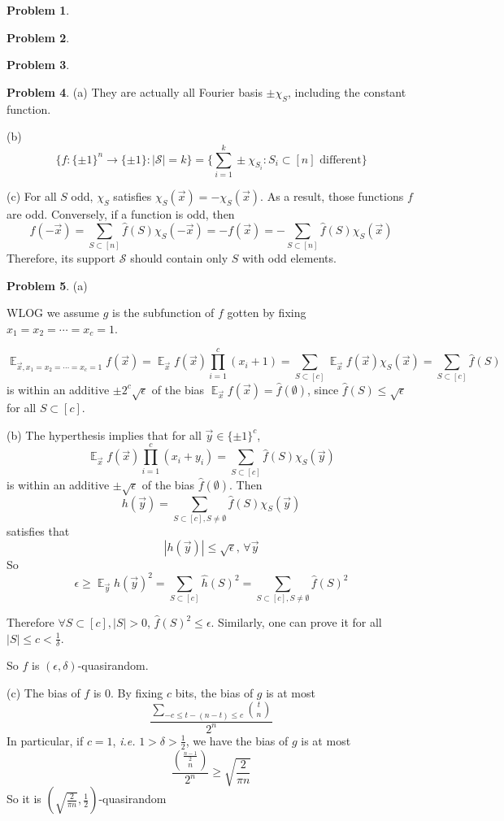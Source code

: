 \documentclass[a4paper]{article}
\theoremstyle{definition}
\newtheorem{problem}{Problem}
\theoremstyle{plain}
\newcommand{\Ebb}{\mathop\mathbb E}
\newcommand{\dps}{\displaystyle}
\newcommand{\<}{\left<}
\renewcommand{\>}{\right>}
\renewcommand{\Ebb}{\mathop\mathbb{E}}
\numberwithin{equation}{problem}
\newcommand{\ie}{ \textit{ i.e. } }
\begin{document}
\begin{problem}
    
\end{problem}
\begin{problem}
    
\end{problem}
\begin{problem}
    
\end{problem}
\begin{problem}
    (a) They are actually all Fourier basis  $ \pm\chi_S $, including the constant function.

    (b) 
    \[\{f:\{\pm 1\}^n\rightarrow \{\pm 1\}:|\mathcal{S}|=k\}=\{\sum_{i=1}^k\pm \chi_{S_i}:S_i\subset [n] \text{ different}\}\] 

    (c) For all  $ S $ odd,  $ \chi_S $ satisfies  $ \chi_S(\vec{x})=-\chi_S(\vec{x}) $. As a result, those functions  $ f $ are odd. Conversely, if a function is odd, then 
    \[f(-\vec{x})=\sum_{S\subset [n]}\hat{f}(S)\chi_S(-\vec{x})=-f(\vec{x})=-\sum_{S\subset [n]}\hat{f}(S)\chi_S(\vec{x})\]
    Therefore,   its support $   \mathcal{S}   $ should contain only  $ S $ with odd elements.      
\end{problem}
\begin{problem}
    (a) 

    WLOG we assume  $ g $ is the subfunction of  $ f $ gotten by fixing  $ x_1=x_2=\cdots=x_c=1 $.    
    
    \[\Ebb_{\vec{x},x_1=x_2=\cdots=x_c=1}f(\vec{x})=\Ebb_{\vec{x}}f(\vec{x})\prod_{i=1}^c(x_i+1)=\sum_{S\subset [c]}\Ebb_{\vec{x}}f(\vec{x})\chi_S(\vec{x})=\sum_{S\subset [c]}\hat{f}(S)\]
    is within an additive  $ \pm2^c\sqrt{\epsilon} $   of the bias  $ \dps\Ebb_{\vec{x}}f(\vec{x})=\hat{f}(\emptyset) $, since  $ \hat{f}(S) \leq \sqrt{\epsilon} $ for all  $ S\subset [c] $.
    
    (b) The hyperthesis implies that for all  $ \vec{y}\in \{\pm 1\}^c $, 
    \[\Ebb_{\vec{x}}f(\vec{x})\prod_{i=1}^c(x_i+y_i)=\sum_{S\subset [c]}\hat{f}(S)\chi_S(\vec{y})\]
    is within an additive  $ \pm \sqrt{\epsilon} $ of the bias  $ \hat{f}(\emptyset) $.
    Then 
    \[h(\vec{y})=\sum_{S\subset [c],S\neq \emptyset}\hat{f}(S)\chi_S(\vec{y})\]
    satisfies that 
    \[|h(\vec{y})| \leq \sqrt{\epsilon},\,\forall \vec{y}\]
    So 
    \[\epsilon \geq \Ebb_{\vec{y}}h(\vec{y})^2=\sum_{S\subset [c]}\hat{h}(S)^2=\sum_{S\subset [c],S\neq \emptyset}\hat{f}(S)^2\] 
    
    Therefore  $ \forall S\subset [c],|S|>0 $,  $ \hat{f}(S)^2 \leq \epsilon $. Similarly, one can prove it for all  $ |S| \leq c<\frac{1}{\delta} $.
    
    So  $ f $ is  $ (\epsilon,\delta) $-quasirandom.
    
    (c) The bias of  $ f $ is  $ 0 $. By fixing  $ c $ bits, the bias of  $ g $ is at most 
    \[\dps\frac{\sum_{-c \leq t-(n-t) \leq c}\binom{t}{n}}{2^n}\]
    In particular, if  $ c=1 $, \ie  $ 1>\delta>\frac{1}{2} $, we have the bias of  $ g $ is at most   
    \[\frac{\binom{\frac{n-1}{2}}{n}}{2^n} \geq \sqrt{\frac{2}{\pi n}}\]
    So it is  $ (\sqrt{\frac{2}{\pi n}},\frac{1}{2}) $-quasirandom         
\end{problem}
\end{document}
